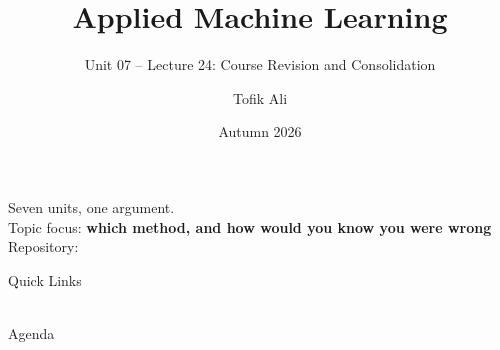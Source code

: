 \documentclass[aspectratio=169]{beamer}
\title[Applied Machine Learning]{Applied Machine Learning}
\subtitle{Unit 07 -- Lecture 24: Course Revision and Consolidation}
\author{Tofik Ali}
\institute{School of Computer Science, UPES Dehradun}
\date{Autumn 2026}
\begin{document}
\UPESCoverFrame
\setcounter{framenumber}{0}

\begin{frame}
  \titlepage
  \begin{center}
    \footnotesize Seven units, one argument.\\[0.25em]
    \footnotesize Topic focus: \textbf{which method, and how would you know
      you were wrong}\\[0.25em]
    \footnotesize Repository: \texttt{\AMLRepoURL}
  \end{center}
  \slidesources{\AMLPrescribed}
\end{frame}

\begin{frame}{Quick Links}
  \centering
  \hyperlink{sec:spine}{}\hspace{0.4em}
  \hyperlink{sec:zoo}{}\hspace{0.4em}
  \hyperlink{sec:choose}{}\hspace{0.4em}
  \hyperlink{sec:mistakes}{}\\[0.6em]
  \hyperlink{sec:e2e}{}\hspace{0.4em}
  \hyperlink{sec:hand}{}\hspace{0.4em}
  \hyperlink{sec:map}{}\\[0.6em]
  \hyperlink{sec:assess}{}\hspace{0.4em}
  \hyperlink{sec:summary}{}
\end{frame}

\begin{frame}{Agenda}
  \tableofcontents
\end{frame}
\end{document}
